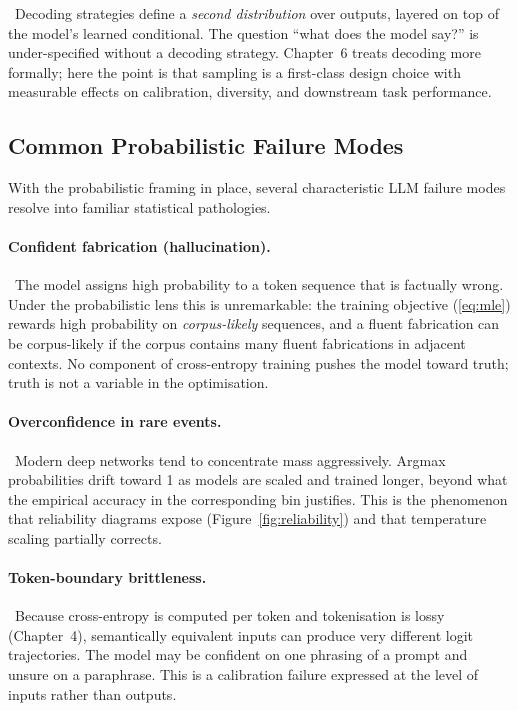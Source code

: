 \Cons\ Decoding strategies define a \emph{second distribution} over
outputs, layered on top of the model's learned conditional. The
question ``what does the model say?'' is under-specified without a
decoding strategy. Chapter~6 treats decoding more formally; here the
point is that sampling is a first-class design choice with measurable
effects on calibration, diversity, and downstream task performance.

\subsection{Common Probabilistic Failure Modes}

With the probabilistic framing in place, several characteristic LLM failure modes resolve into familiar statistical pathologies.

\paragraph{Confident fabrication (hallucination).}
\Emp\ The model assigns high probability to a token sequence that is
factually wrong. Under the probabilistic lens this is unremarkable: the
training objective (\ref{eq:mle}) rewards high probability on
\emph{corpus-likely} sequences, and a fluent fabrication can be
corpus-likely if the corpus contains many fluent fabrications in
adjacent contexts. No component of cross-entropy training pushes the
model toward truth; truth is not a variable in the optimisation.

\paragraph{Overconfidence in rare events.}
\Emp\ Modern deep networks tend to concentrate mass aggressively. Argmax
probabilities drift toward 1 as models are scaled and trained longer,
beyond what the empirical accuracy in the corresponding bin justifies.
This is the phenomenon that reliability diagrams expose
(Figure~\ref{fig:reliability}) and that temperature scaling partially
corrects.

\paragraph{Token-boundary brittleness.}
\Emp\ Because cross-entropy is computed per token and tokenisation is
lossy (Chapter~4), semantically equivalent inputs can produce very
different logit trajectories. The model may be confident on one phrasing
of a prompt and unsure on a paraphrase. This is a calibration failure
expressed at the level of inputs rather than outputs.

